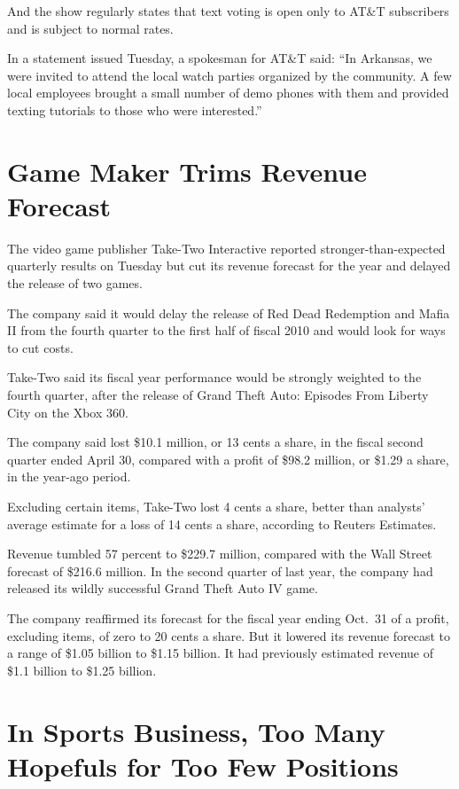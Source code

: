 \documentclass[12pt,a4paper,onecolumn]{article}
\begin{document}
And the show regularly states that text voting is open only to AT\&T subscribers and is subject to
normal rates.

In a statement issued Tuesday, a spokesman for AT\&T said: ``In Arkansas, we were invited to attend
the local watch parties organized by the community. A few local employees brought a small number of
demo phones with them and provided texting tutorials to those who were interested.''

\section{Game Maker Trims Revenue Forecast}

The video game publisher Take-Two Interactive reported stronger-than-expected quarterly results on
Tuesday but cut its revenue forecast for the year and delayed the release of two games.

The company said it would delay the release of Red Dead Redemption and Mafia II from the fourth
quarter to the first half of fiscal 2010 and would look for ways to cut costs.

Take-Two said its fiscal year performance would be strongly weighted to the fourth quarter, after
the release of Grand Theft Auto: Episodes From Liberty City on the Xbox 360.

The company said lost \$10.1 million, or 13 cents a share, in the fiscal second quarter ended April
30, compared with a profit of \$98.2 million, or \$1.29 a share, in the year-ago period.

Excluding certain items, Take-Two lost 4 cents a share, better than analysts' average estimate for a
loss of 14 cents a share, according to Reuters Estimates.

Revenue tumbled 57 percent to \$229.7 million, compared with the Wall Street forecast of \$216.6
million. In the second quarter of last year, the company had released its wildly successful Grand
Theft Auto IV game.

The company reaffirmed its forecast for the fiscal year ending Oct.~31 of a profit, excluding items,
of zero to 20 cents a share. But it lowered its revenue forecast to a range of \$1.05 billion to
\$1.15 billion. It had previously estimated revenue of \$1.1 billion to \$1.25 billion.

\section{In Sports Business, Too Many Hopefuls for Too Few Positions}
\end{document}
